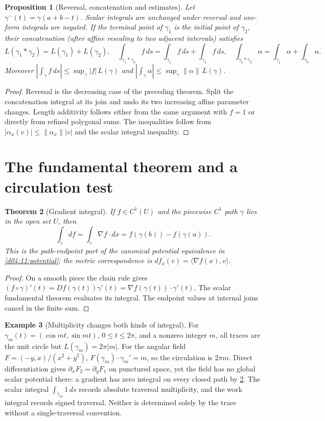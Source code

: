 \documentclass[11pt,oneside,openany]{book}
\newtheorem{theorem}{Theorem}[chapter]
\newtheorem{proposition}[theorem]{Proposition}
\theoremstyle{definition}
\newtheorem{example}[theorem]{Example}
\theoremstyle{remark}
\newcommand{\ip}[2]{\langle#1,#2\rangle}
\newcommand{\family}[1]{}
\begin{document}
\family{K04.09.07}
\begin{proposition}[Reversal, concatenation and estimates]\label{d04:09:path-algebra}
Let $\gamma^{-}(t)=\gamma(a+b-t)$. Scalar integrals are unchanged under
reversal and one-form integrals are negated. If the terminal point of
$\gamma_1$ is the initial point of $\gamma_2$, their concatenation (after
affine rescaling to two adjacent intervals) satisfies
\[
 L(\gamma_1*\gamma_2)=L(\gamma_1)+L(\gamma_2),\quad
 \int_{\gamma_1*\gamma_2}f\,ds=\int_{\gamma_1}f\,ds+\int_{\gamma_2}f\,ds,
 \quad\int_{\gamma_1*\gamma_2}\alpha=\int_{\gamma_1}\alpha+\int_{\gamma_2}\alpha.
\]
Moreover $|\int_\gamma f\,ds|\le\sup_\gamma|f|\,L(\gamma)$ and
$|\int_\gamma\alpha|\le\sup_\gamma\|\alpha\|\,L(\gamma)$.
\end{proposition}
\begin{proof}
Reversal is the decreasing case of the preceding theorem. Split the
concatenation integral at its join and undo its two increasing affine
parameter changes. Length additivity follows either from the same argument
with $f=1$ or directly from refined polygonal sums. The inequalities follow
from $|\alpha_x(v)|\le\|\alpha_x\||v|$ and the scalar integral inequality.
\end{proof}

\section{The fundamental theorem and a circulation test}
\family{K04.09.08}\family{K04.09.09}
\begin{theorem}[Gradient integral]\label{d04:09:gradient-integral}
If $f\in C^1(U)$ and the piecewise $C^1$ path $\gamma$ lies in the open
set $U$, then
\[
 \int_\gamma df=\int_\gamma\nabla f\cdot dx=f(\gamma(b))-f(\gamma(a)).
\]
This is the path-endpoint part of the canonical potential equivalence in
\cref{d04:11:potential}; the metric correspondence is
$df_x(v)=\ip{\nabla f(x)}{v}$.
\end{theorem}
\begin{proof}
On a smooth piece the chain rule gives
$(f\circ\gamma)'(t)=Df(\gamma(t))\gamma'(t)
=\nabla f(\gamma(t))\cdot\gamma'(t)$.
The scalar fundamental theorem evaluates its integral. The endpoint values
at internal joins cancel in the finite sum.
\end{proof}

\begin{example}[Multiplicity changes both kinds of integral]\label{d04:09:circle}
For $\gamma_m(t)=(\cos mt,\sin mt)$, $0\le t\le2\pi$, and a nonzero
integer $m$, all traces are the unit circle but $L(\gamma_m)=2\pi|m|$.
For the angular field $F=(-y,x)/(x^2+y^2)$,
$F(\gamma_m)\cdot\gamma_m'=m$, so the circulation is $2\pi m$.
Direct differentiation gives $\partial_xF_2=\partial_yF_1$ on punctured
space, yet the field has no global scalar potential there: a gradient has
zero integral on every closed path by \cref{d04:09:gradient-integral}.
The scalar integral $\int_{\gamma_m}1\,ds$ records absolute traversal
multiplicity, and the work integral records signed traversal. Neither is
determined solely by the trace without a single-traversal convention.
\end{example}
\end{document}
